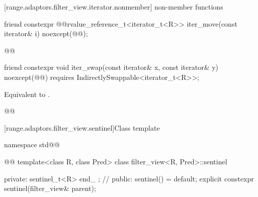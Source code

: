 {\begin{itemdescr}
\pnum
\oldtxt{\returns} 
\end{itemdescr}

[range.adaptors.filter_view.iterator.nonmember]{ non-member functions}

%
\begin{itemdecl}
friend constexpr @@rvalue_reference_t<iterator_t<R>> iter_move(const iterator& i)
  noexcept(@\oldtxt{\seebelow}@);
\end{itemdecl}

\begin{itemdescr}
\pnum
\oldtxt{\returns} 

\pnum
{}
\begin{codeblock}
@@
\end{codeblock}
\end{itemdescr}

%
\begin{itemdecl}
friend constexpr void iter_swap(const iterator& x, const iterator& y)
  noexcept(@\oldtxt{\seebelow}@)
  requires IndirectlySwappable<iterator_t<R>>;
\end{itemdecl}

\begin{itemdescr}
\pnum
\effects Equivalent to .

\pnum
{}
\begin{codeblock}
@@
\end{codeblock}
\end{itemdescr}

[range.adaptors.filter_view.sentinel]{Class template }

%
\begin{codeblock}
namespace std@@ { @@
  template<class R, class Pred>
  class filter_view<R, Pred>::sentinel {
  private:
    sentinel_t<R> end_ {}; // \expos
  public:
    sentinel() = default;
    explicit constexpr sentinel(filter_view& parent);

}}
\end{codeblock}}
